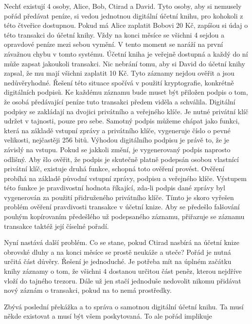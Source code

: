 Nechť existují 4 osoby, Alice, Bob, Ctirad a David. Tyto osoby, aby si nemusely pořád předávat peníze, si vedou jednotnou digitální účetní knihu,
pro kohokoli z této čtveřice dostupnou. Pokud má Alice zaplatit Bobovi 20 Kč, zapíšou si údaj o této transakci do účetní knihy. Vždy na
konci měsíce se všichni 4 sejdou a opravdové peníze mezi sebou vymění. V tento moment se naráží na první závažnou chybu v tomto systému.
Účetní kniha je veřejně dostupná a každý do ní může zapsat jakoukoli transakci. Nic nebrání tomu, aby si David do účetní knihy zapsal, že
mu mají všichni zaplatit 10 Kč. Tyto záznamy nejdou ověřit a jsou nedůvěryhodné. Řešení této situace spočívá v použití kryptografie,
konkrétně digitálních podpisů. Ke každému záznamu bude muset být přiložen podpis o tom, že osobá předávající peníze tuto transakci předem
viděla a schválila. Digitální podpisy se zakládají na dvojici privátního a veřejného klíče. Je nutné privátní klíč udržet v tajnosti,
pouze pro sebe. Samotný podpis můžeme chápat jako funkci, která na základě vstupní zprávy a privátního klíče, vygeneruje číslo o pevné velikosti,
nejčastěji 256 bitů. Výhodou digitálního podpisu je právě to, že je závislý na vstupu. Pokud se jakkoli změní, je vygenerovaný podpis
naprosto odlišný. Aby šlo ověřit, že podpis je skutečně platně podepsán osobou vlastnící privátní klíč, existuje druhá funkce, schopná
toto ověření provést. Ověření probíhá na základě původní vstupní zprávy, podpisu a veřejného klíče. Výstupem této funkce je pravdivostní
hodnota říkající, zda-li podpis dané zprávy byl vygenerován za použití přidruženého privátního klíče. Tímto je skoro vyřešen problém ověření
pravdivosti transakce v účetní knize. Aby se předešlo falšování pouhým kopírovaním předešlého už podepsaného záznamu, přiřazuje se záznamu
transakce taktéž její číselné pořadí.

Nyní nastává další problém. Co se stane, pokud Ctirad nasbírá na účetní knize obrovské dluhy a na konci měsíce se prostě neukáže a uteče?
Pořád je nutná určitá část důvěry. Řešení je jednoduché. Je potřeba mít na úplném začátku knihy záznamy o tom, že všichni 4 dostanou
určitou část peněz, kterou nejdříve vloží do tajného trezoru. Dále už jen stačí jednoduše nedovolit nikomu přidávat
nový záznám o transakci, pokud na to nemá prostředky.

Zbývá poslední překážka a to správa o samotnou digitální účetní knihu. Ta musí někde existovat a musí být všem poskytovaná. To ale pořád
implikuje


